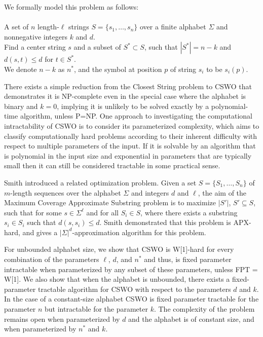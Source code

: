 We formally model this problem as follows:\\

 \\
 A set of $n$ length-$\ell$ strings $S = \{s_1, \ldots, s_n\}$ over a finite alphabet $\Sigma$ and nonnegative integers $k$ and $d$.\\
 Find a center string $s$ and a subset of $S^* \subset S$, such that $|S^*| = n-k$ and $d(s,t)\le d$ for $t\in S^*$.\\

We denote $n - k$ as $n^*$, and the symbol at position $p$ of string $s_i$ to be $s_i(p)$.

There exists a simple reduction from the {\sc Closest String} problem to {\sc CSWO} that demonstrates it is NP-complete even in the special case where the alphabet is binary and $k=0$, implying it is unlikely to be solved exactly by a polynomial-time algorithm, unless P=NP.  One approach to investigating the computational intractability of {\sc CSWO} is to consider its parameterized complexity, which aims to classify computationally hard problems according to their inherent difficulty with respect to multiple parameters of the input. If it is solvable by an algorithm that is polynomial in the input size and exponential in parameters that are typically small then it can still be considered tractable in some practical sense.

Smith \cite{asmith} introduced a related optimization problem.  Given a set $S = \{S_1, \ldots, S_n\}$ of $m$-length sequences over the alphabet $\Sigma$ and integers $d$ and $\ell$, the aim of the {\sc Maximum Coverage Approximate Substring} problem is to maximize $|S'|$, $S' \subseteq S$, such that for some $s \in \Sigma^{\ell}$ and for all $S_i \in S$, where there exists a substring $s_i \in S_i$ such that $d(s, s_i) \leq d$.  Smith demonstrated that this problem is APX-hard, and gives a $|\Sigma|^d$-approximation algorithm for this problem.  
  
For unbounded alphabet size, we show that {\sc CSWO} is W[1]-hard for every combination of the parameters $\ell$, $d$, and $n^*$ and thus, is fixed parameter intractable when parameterized by any subset of these parameters, unless FPT = W[1].  We also show that when the alphabet is unbounded, there exists a fixed-parameter tractable algorithm for {\sc CSWO} with respect to the parameters $d$ and $k$.  In the case of a constant-size alphabet {\sc CSWO} is fixed parameter tractable for the parameter $n$ but intractable for the parameter $k$.  The complexity of the problem remains open when parameterized by $d$ and the alphabet is of constant size, and when parameterized by $n^*$ and $k$.  

